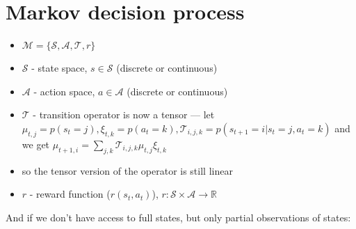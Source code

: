 \documentclass{report}
\begin{document}
\section{Markov decision process}
\begin{figure}[htpb]
\begin{center}
\end{center}
\end{figure}
\begin{itemize}
		\item $\mathcal{M} = \{\mathcal{S}, \mathcal{A}, \mathcal{T}, r\}$
\item $\mathcal{S}$ - state space, $s \in \mathcal{S}$ (discrete or continuous)
\item $\mathcal{A}$ - action space, $a \in \mathcal{A}$ (discrete or continuous)
\item $\mathcal{T}$ - transition operator is now a tensor ---
		let $\mu_{t,j} = p(s_t = j), \xi_{t,k} = p(a_t = k), \mathcal{T}_{i,j,k} = p(s_{t+1} = i | s_t =j, a_t =k) $
		and we get $\mu_{t+1,i} = \sum_{j,k}^{} \mathcal{T}_{i,j,k} \mu_{t,j} \xi_{t,k}$
\item so the tensor version of the operator is still linear
\item $r$ - reward function ($r(s_t, a_t)$), $r : \mathcal{S} \times \mathcal{A} \to \mathbb{R}$
\end{itemize}
And if we don't have access to full states, but only partial observations of states:
\end{document}
